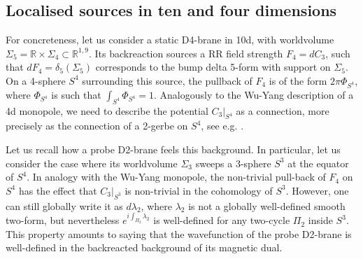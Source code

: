 \documentclass[11pt]{article}
\newcommand{\IR}{\mathbb{R}}
\begin{document}
\subsection{Localised sources in ten and four dimensions}

For concreteness, let us consider a static D4-brane in 10d, with worldvolume $\Sigma_5 = \IR \times \Sigma_4 \subset \IR^{1,9}$. Its backreaction sources a RR field strength $F_{4} = dC_{3}$, such that $dF_{4} = \delta_5(\Sigma_5)$  corresponds to the bump delta 5-form with support on $\Sigma_5$. On a 4-sphere $S^4$ surrounding this source, the pullback of $F_4$ is of the form $2\pi \Phi_{S^4}$, where $\Phi_{S^4}$ is such that $\int_{S^{4}} \Phi_{S^4} = 1$. Analogously to the Wu-Yang description of a 4d monopole, we need to describe the potential $C_{3}|_{S^4}$ as a connection, more precisely as the connection of a 2-gerbe on $S^4$, see e.g. \cite{Hitchin:1999fh}. 

Let us  recall how a probe D2-brane feels this background. In particular, let us consider the case where its worldvolume $\Sigma_{3}$ sweeps a 3-sphere $S^{3}$ at the equator of $S^{4}$. In analogy with the Wu-Yang monopole, the non-trivial pull-back of $F_{4}$ on $S^{4}$ has the effect that $C_{3}|_{S^{3}}$ is non-trivial in the cohomology of $S^3$. However, one can still globally write it as $d\lambda_{2}$, where $\lambda_{2}$ is not a globally well-defined smooth two-form, but nevertheless $e^{i\int_{\Pi_{2}} \lambda_{2}}$ is well-defined for any two-cycle $\Pi_{2}$ inside  $S^{3}$. This property amounts to saying that the wavefunction of the probe D2-brane is well-defined in the backreacted background of its magnetic dual. 
\end{document}
